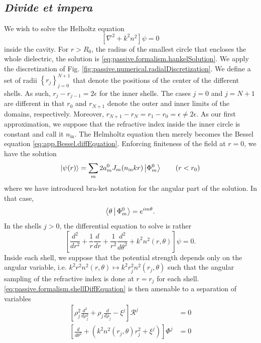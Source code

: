 \subsection{\textit{Divide et impera}}
We wish to solve the Helholtz equation 
  \begin{equation}
   \left[\nabla^2+k^2n^2\right]\psi = 0
  \end{equation}
inside the cavity. For $r>R_0$, the radius of the smallest circle
that encloses the whole dielectric, the solution is 
\eqref{eq:passive.formalism.hankelSolution}. We apply the discretization
of Fig. \ref{fig:passive.numerical.radialDiscretization}. We define a set of 
radii $\left\{r_j\right\}_{j=0}^{N+1}$ that denote the positions of the center
of the different shells. As such, $r_j-r_{j-1}=2\epsilon$ for the inner shells.
The cases $j=0$ and $j=N+1$ are different in that $r_0$ and $r_{N+1}$ denote 
the outer and inner limits of the domains, respectively. Moreover, $r_{N+1}-r_N=r_1-r_0=\epsilon\neq2\epsilon$.
As our first approximation, we suppose that the refractive index
inside the inner circle is constant and call it $n_\text{in}$. The Helmholtz equation then merely
becomes the Bessel equation \eqref{eq:app.Bessel.diffEquation}. Enforcing
finiteness of the field at $r=0$, we have the solution
  \begin{equation}
   \Ket{\psi(r)} = \sum_{m}2a_m^0J_m(n_\text{in}kr)\Ket{\Phi_m^0}	\qquad (r<r_0)
  \end{equation}
where we have introduced bra-ket notation for the angular part of the 
solution. In that case, 
  \begin{equation}
   \Braket{\theta|\Phi_m^0} = e^{im\theta}.
  \end{equation}
In the shells $j>0$, the differential equation to solve is rather
  \begin{equation}
    \label{eq:passive.formalism.shellDiffEquation}
    \left[\frac{d^2}{dr^2}+\frac{1}{r}\frac{d}{dr}+\frac{1}{r^2}\frac{d^2}{d\theta^2}+k^2n^2(r,\theta)\right]\psi=0.
  \end{equation}
Inside each shell, we suppose that the potential strength depends only on the angular variable, i.e.
$k^2r^2n^2(r,\theta)\mapsto k^2r_j^2n^2(r_j,\theta)$ such that the angular sampling of the refractive
index is done at $r=r_j$ for each shell. \eqref{eq:passive.formalism.shellDiffEquation} 
is then amenable to a separation of variables
  \begin{subequations}
  \begin{align}
   \left[\rho_j^2\frac{d^2}{d\rho_j^2}+\rho_j\frac{d}{d\rho_j}-\xi^j\right]\mathcal{R}^j	&=0	\label{eq:passive.formalism.radialDiffEqn}	\\
   \left[\frac{d}{d\theta^2}+\left(k^2n^2(r_j,\theta)r_j^2+\xi^j\right)\right]\Phi^j		&=0
  \end{align}
  \end{subequations}
